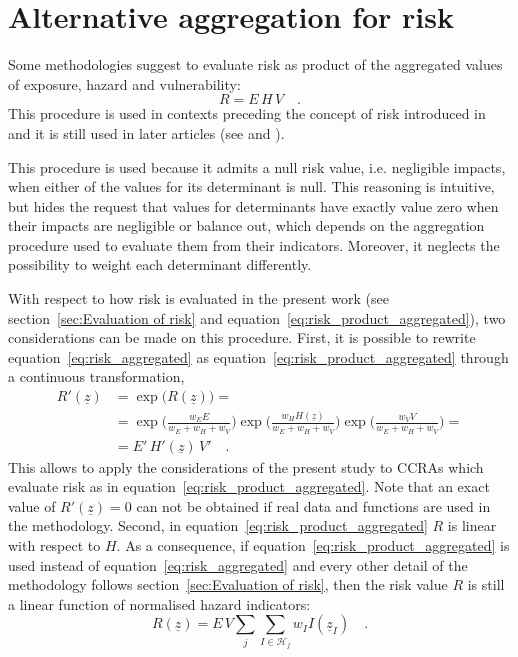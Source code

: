 \section{Alternative aggregation for risk}
Some methodologies suggest to evaluate \gls{risk} as product of the aggregated values of \gls{exposure}, \gls{hazard} and \gls{vulnerability}:
\begin{equation}
  \label{eq:risk_product_aggregated}
  R = E \, H \, V
  \quad .
\end{equation}
This procedure is used in contexts preceding the concept of \gls{risk} introduced in \cite{2012FieldManagingThe} and it is still used in later articles (see \cite[7]{2023DeVivoApplicationOf} and \cite[6]{2023DeVivoClimate-RiskAssessment}).

This procedure is used because it admits a null \gls{risk} value, i.e. negligible \glspl{impact}, when either of the values for its \gls{determinant} is null. This reasoning is intuitive, but hides the request that values for \glspl{determinant} have exactly value zero when their \glspl{impact} are negligible or balance out, which depends on the aggregation procedure used to evaluate them from their \glspl{indicator}. Moreover, it neglects the possibility to weight each \gls{determinant} differently.

With respect to how \gls{risk} is evaluated in the present work (see section~\ref{sec:Evaluation of risk} and equation~\eqref{eq:risk_product_aggregated}), two considerations can be made on this procedure.
First, it is possible to rewrite equation~\eqref{eq:risk_aggregated} as equation~\eqref{eq:risk_product_aggregated} through a continuous transformation,
\begin{equation}
  \label{eq:risk_equivalence}
  \begin{split}
    R'(\underline{z}) & = \exp{\big( R(\underline{z}) \big)} = \\
    & = \exp{\bigg( \frac{w_E E}{w_E + w_H + w_V} \bigg)} \exp{\bigg( \frac{w_H H(\underline{z})}{w_E + w_H + w_V} \bigg)} \exp{\bigg( \frac{w_V V}{w_E + w_H + w_V} \bigg)} = \\
    & = E' \, H'(\underline{z}) \, V'
    \quad .
  \end{split}
\end{equation}
This allows to apply the considerations of the present study to \glspl{CCRA} which evaluate \gls{risk} as in equation~\eqref{eq:risk_product_aggregated}. Note that an exact value of $R'(\underline{z}) = 0$ can not be obtained if real data and functions are used in the methodology.
Second, in equation~\eqref{eq:risk_product_aggregated} $R$ is linear with respect to $H$. As a consequence, if equation~\eqref{eq:risk_product_aggregated} is used instead of equation~\eqref{eq:risk_aggregated} and every other detail of the methodology follows section~\ref{sec:Evaluation of risk}, then the \gls{risk} value $R$ is still a linear function of normalised \gls{hazard} \glspl{indicator}:
\begin{equation}
  \label{eq:risk_product_linearity}
  R(\underline{z}) = E \, V \sum_j \sum_{I \in \mathcal{H}_j} w_I I(\underline{z}_I)
  \quad .
\end{equation}
